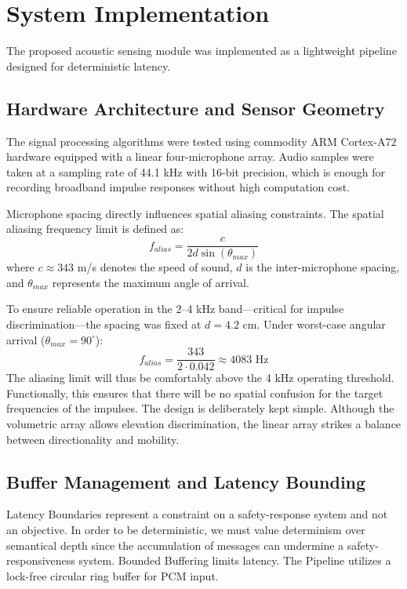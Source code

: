 \documentclass[conference]{IEEEtran}
\begin{document}
\section{System Implementation}

The proposed acoustic sensing module was implemented as a lightweight pipeline designed for deterministic latency.

\subsection{Hardware Architecture and Sensor Geometry}
The signal processing algorithms were tested using commodity ARM Cortex-A72 hardware equipped with a linear four-microphone array. Audio samples were taken at a sampling rate of 44.1 kHz with 16-bit precision, which is enough for recording broadband impulse responses without high computation cost.

Microphone spacing directly influences spatial aliasing constraints. The spatial aliasing frequency limit is defined as:
\begin{equation}
f_{alias} = \frac{c}{2d \sin(\theta_{max})}
\end{equation}
where $c \approx 343$ m/s denotes the speed of sound, $d$ is the inter-microphone spacing, and $\theta_{max}$ represents the maximum angle of arrival.

To ensure reliable operation in the 2–4 kHz band—critical for impulse discrimination—the spacing was fixed at $d = 4.2$ cm. Under worst-case angular arrival ($\theta_{max} = 90^\circ$):
\begin{equation}
f_{alias} = \frac{343}{2 \cdot 0.042} \approx 4083 \text{ Hz}
\end{equation}
The aliasing limit will thus be comfortably above the 4 kHz operating threshold. Functionally, this ensures that there will be no spatial confusion for the target frequencies of the impulses. The design is deliberately kept simple. Although the volumetric array allows elevation discrimination, the linear array strikes a balance between directionality and mobility.

\subsection{Buffer Management and Latency Bounding}
Latency Boundaries represent a constraint on a safety-response system and not an objective. In order to be deterministic, we must value determinism over semantical depth since the accumulation of messages can undermine a safety-responsiveness system. Bounded Buffering limits latency. The Pipeline utilizes a lock-free circular ring buffer for PCM input.
\end{document}
